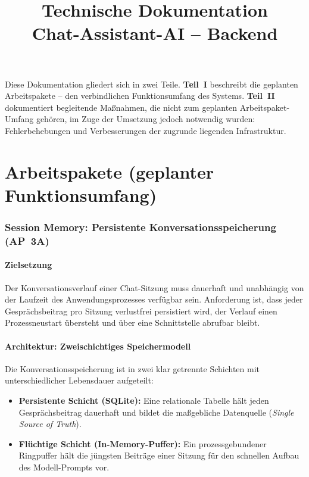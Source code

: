 \documentclass[11pt,a4paper]{article}
\title{Technische Dokumentation\\\large Chat-Assistant-AI -- Backend}
\author{}
\date{}
\begin{document}
\maketitle

\noindent
Diese Dokumentation gliedert sich in zwei Teile. \textbf{Teil~I} beschreibt die
geplanten Arbeitspakete -- den verbindlichen Funktionsumfang des Systems. \textbf{Teil~II}
dokumentiert begleitende Maßnahmen, die nicht zum geplanten Arbeitspaket-Umfang gehören,
im Zuge der Umsetzung jedoch notwendig wurden: Fehlerbehebungen und Verbesserungen der
zugrunde liegenden Infrastruktur.

\tableofcontents

\part{Arbeitspakete (geplanter Funktionsumfang)}

\section{Session Memory: Persistente Konversationsspeicherung (AP~3A)}

\subsection{Zielsetzung}

Der Konversationsverlauf einer Chat-Sitzung muss dauerhaft und unabhängig von der
Laufzeit des Anwendungsprozesses verfügbar sein. Anforderung ist, dass jeder
Gesprächsbeitrag pro Sitzung verlustfrei persistiert wird, der Verlauf einen
Prozessneustart übersteht und über eine Schnittstelle abrufbar bleibt.

\subsection{Architektur: Zweischichtiges Speichermodell}

Die Konversationsspeicherung ist in zwei klar getrennte Schichten mit
unterschiedlicher Lebensdauer aufgeteilt:

\begin{itemize}
  \item \textbf{Persistente Schicht (SQLite):} Eine relationale Tabelle hält jeden
        Gesprächsbeitrag dauerhaft und bildet die maßgebliche Datenquelle
        (\emph{Single Source of Truth}).
  \item \textbf{Flüchtige Schicht (In-Memory-Puffer):} Ein prozessgebundener
        Ringpuffer hält die jüngsten Beiträge einer Sitzung für den schnellen
        Aufbau des Modell-Prompts vor.
\end{itemize}
\end{document}
